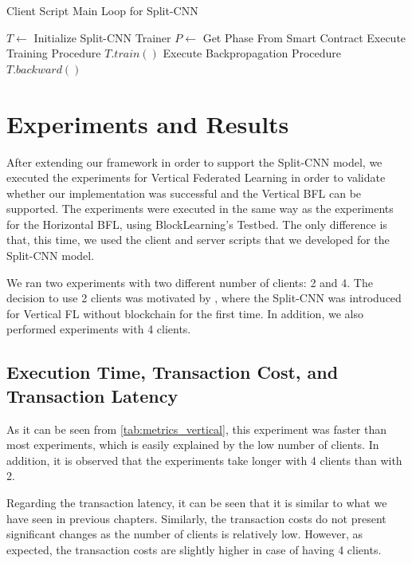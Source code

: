 \begin{algorithm}
\caption{Client Script Main Loop for Split-CNN}\label{alg:client_loop_splitcnn}
\begin{algorithmic}
\State $T \gets $ Initialize Split-CNN Trainer
    \State $P \gets$ Get Phase From Smart Contract
        \State Execute Training Procedure $T.train()$
        \State Execute Backpropagation Procedure $T.backward()$
    \EndIf
\EndWhile
\end{algorithmic}
\end{algorithm}

\section{Experiments and Results}

After extending our framework in order to support the Split-CNN model, we executed the experiments for Vertical Federated Learning in order to validate whether our implementation was successful and the Vertical BFL can be supported. The experiments were executed in the same way as the experiments for the Horizontal BFL, using BlockLearning's Testbed. The only difference is that, this time, we used the client and server scripts that we developed for the Split-CNN model.

We ran two experiments with two different number of clients: 2 and 4. The decision to use 2 clients was motivated by \cite{10.1145/3297858.3304038}, where the Split-CNN was introduced for Vertical FL without blockchain for the first time. In addition, we also performed experiments with 4 clients.

\subsection{Execution Time, Transaction Cost, and Transaction Latency}

As it can be seen from \autoref{tab:metrics_vertical}, this experiment was faster than most experiments, which is easily explained by the low number of clients. In addition, it is observed that the experiments take longer with 4 clients than with 2.

Regarding the transaction latency, it can be seen that it is similar to what we have seen in previous chapters. Similarly, the transaction costs do not present significant changes as the number of clients is relatively low. However, as expected, the transaction costs are slightly higher in case of having 4 clients.

